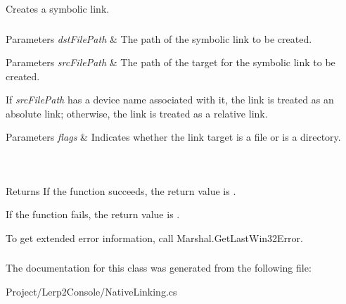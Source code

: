 Creates a symbolic link. 



 

 

\subsubsection*{}


\begin{DoxyParams}{Parameters}
{\em dst\+File\+Path} & The path of the symbolic link to be created. \\
\hline
\end{DoxyParams}



\begin{DoxyParams}{Parameters}
{\em src\+File\+Path} & The path of the target for the symbolic link to be created. \\
\hline
\end{DoxyParams}


If {\itshape src\+File\+Path}  has a device name associated with it, the link is treated as an absolute link; otherwise, the link is treated as a relative link. 


\begin{DoxyParams}{Parameters}
{\em flags} & Indicates whether the link target is a file or is a directory. \subsubsection*{}\\
\hline
\end{DoxyParams}
\begin{DoxyReturn}{Returns}
If the function succeeds, the return value is . 


\end{DoxyReturn}
If the function fails, the return value is . 

To get extended error information, call Marshal.\+Get\+Last\+Win32\+Error. 

\subsubsection*{}

The documentation for this class was generated from the following file\+:\begin{DoxyCompactItemize}
\item 
Project/\+Lerp2\+Console/Native\+Linking.\+cs\end{DoxyCompactItemize}
